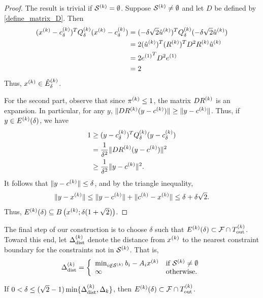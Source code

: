 \documentclass{article}
\begin{document}
\begin{proof}
The result is trivial if $\mathcal{S}^{(k)} = \emptyset$.   Suppose $\mathcal{S}^{(k)} \ne \emptyset$ and let $D$ be defined by 
\cref{define_matrix_D}.  Then
\begin{align*}
(x^{(k)}-c^{(k)}_{\delta})^T {Q^{(k)}_{\delta}} (x^{(k)}-c^{(k)}_{\delta}) & = (-\delta\sqrt{2} {{{\hat u}^{(k)}}})^T {Q^{(k)}_{\delta}} (-\delta\sqrt{2} {{{\hat u}^{(k)}}}) \\
& = 2  ({{{\hat u}^{(k)}}})^T ({R^{(k)}})^T D^2 {R^{(k)}} {{{\hat u}^{(k)}}} \\
& = 2 {e^{(1)}}^T D^2 {e^{(1)}}  \\
& = 2
\end{align*}
Thus, $x^{(k)} \in {{\hat E}^{(k)}_{\delta}}$.

For the second part, observe that since $\pi^{(k)} \le 1$, the matrix $D{R^{(k)}}$ is an expansion.  
In particular, for any $y$,  $\|D {R^{(k)}} (y-c^{(k)})\| \ge \|y-c^{(k)}\|$.   Thus, if $y \in {E^{(k)}}(\delta)$, we have
\begin{align*}
1 & \ge (y-c^{(k)}_{\delta})^T {Q^{(k)}_{\delta}} (y-c^{(k)}_{\delta}) \\
& = \frac{1}{\delta^2}\|D{R^{(k)}}(y-c^{(k)})\|^2 \\
& \ge \frac{1}{\delta^2}\| y-c^{(k)}\|^2.
\end{align*}
It follows that $\|y-c^{(k)}\| \le \delta$, and by the triangle inequality,
\[ \|y-x^{(k)}\| \le \|y-c^{(k)}\| + \|c^{(k)}-x^{(k)}\| \le \delta + \delta \sqrt{2}.\]
Thus, ${E^{(k)}}(\delta) \subseteq B\left(x^{(k)}; \delta(1+\sqrt{2})\right)$.
\end{proof}

The final step of our construction is to choose $\delta$ such that ${E^{(k)}}(\delta) \subset {\mathcal F} \cap {T_{\text{out}}^{(k)}}$.    Toward this end,  let $\Delta_{\textrm{dist}}^{(k)}$ denote the distance from $x^{(k)}$ to the nearest constraint boundary for the constraints not in $\mathcal{S}^{(k)}$.  That is,
\[ \Delta_{\textrm{dist}}^{(k)} = \left\{ \begin{array}{ll} \min_{i \not \in \mathcal{S}^{(k)}} b_i - A_i x^{(k)} & \mbox{if }\mathcal{S}^{(k)} \ne \emptyset \\
 \infty & \mbox{otherwise.}\end{array} \right.\]
 

\begin{lemma}
If $0 < \delta \le (\sqrt{2}-1) \min\{ \Delta_{\textrm{dist}}^{(k)},  \Delta_k \}$, then ${E^{(k)}}(\delta) \subset {\mathcal F} \cap {T_{\text{out}}^{(k)}}$.
\end{lemma}
\end{document}
